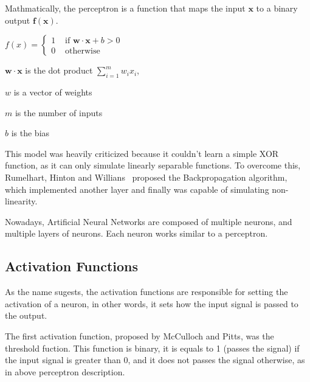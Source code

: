 Mathmatically, the perceptron is a function that maps the input $\boldsymbol{x}$ to a binary output $\boldsymbol{f(x)}$.

\begin{minipage}{\textwidth}
\begin{center}
$
f(x)=\begin{cases}
1 & \text{ if } \boldsymbol{w \cdot x} + b > 0 \\
0 & \text{ otherwise }
\end{cases}
$
\end{center}

\vspace{0.5cm}

\hspace{4.5cm}$\boldsymbol{w \cdot x}$ is the dot product $\sum_{i=1}^{m}w_{i}x_{i}$,

\hspace{4.5cm}$w$ is a vector of weights

\hspace{4.5cm}$m$ is the number of inputs

\hspace{4.5cm}$b$ is the bias
\end{minipage}

\vspace{0.5cm}

This model was heavily criticized because it couldn't learn a simple XOR function, as it can only simulate linearly separable functions. To overcome this, Rumelhart, Hinton and Willians~\cite{Rumelhart1986} proposed the Backpropagation algorithm, which implemented another layer and finally was capable of simulating non-linearity.

Nowadays, Artificial Neural Networks are composed of multiple neurons, and multiple layers of neurons. Each neuron works similar to a perceptron.

\subsection{Activation Functions}

As the name sugests, the activation functions are responsible for setting the activation of a neuron, in other words, it sets how the input signal is passed to the output.

The first activation function, proposed by McCulloch and Pitts, was the threshold fuction. This function is binary, it is equals to 1 (passes the signal) if the input signal is greater than 0, and it does not passes the signal otherwise, as in above perceptron description.

